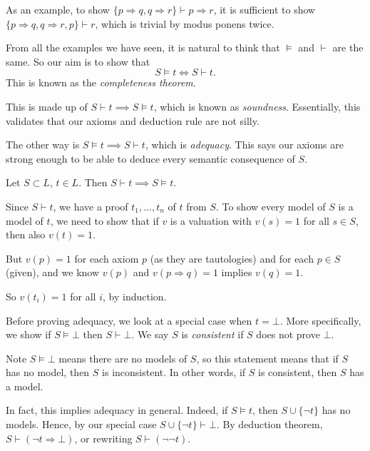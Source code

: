 \documentclass[12pt]{article}
\begin{document}
As an example, to show $\{p \Rightarrow q, q \Rightarrow r\} \vdash p \Rightarrow r$, it is sufficient to show $\{p \Rightarrow q, q \Rightarrow r, p\} \vdash r$, which is trivial by modus ponens twice.

From all the examples we have seen, it is natural to think that $\models$ and $\vdash$ are the same. So our aim is to show that
\[
	S \models t \iff S \vdash t
.\]
This is known as the \emph{completeness theorem}.

This is made up of $S \vdash t \implies S \models t$, which is known as \emph{soundness}. Essentially, this validates that our axioms and deduction rule are not silly.

The other way is $S \models t \implies S \vdash t$, which is \emph{adequacy}. This says our axioms are strong enough to be able to deduce every semantic consequence of $S$.

\begin{proposition}[Soundness]
	Let $S \subset L$, $t \in L$. Then $S \vdash t \implies S \models t$.
\end{proposition}

\begin{proofbox}
	Since $S \vdash t$, we have a proof $t_1, \ldots, t_n$ of $t$ from $S$. To show every model of $S$ is a model of $t$, we need to show that if $v$ is a valuation with $v(s) = 1$ for all $s \in S$, then also $v(t) = 1$.

	But $v(p) = 1$ for each axiom $p$ (as they are tautologies) and for each $p \in S$ (given), and we know $v(p)$ and $v(p \Rightarrow q) = 1$ implies $v(q) = 1$.

	So $v(t_i) = 1$ for all $i$, by induction.
\end{proofbox}

Before proving adequacy, we look at a special case when $t = \bot$. More specifically, we show if $S \models \bot$ then $S \vdash \bot$. We say $S$ is \emph{consistent} if $S$ does not prove $\bot$.

Note $S \models \bot$ means there are no models of $S$, so this statement means that if $S$ has no model, then $S$ is inconsistent. In other words, if $S$ is consistent, then $S$ has a model.

In fact, this implies adequacy in general. Indeed, if $S \models t$, then $S \cup \{\neg t\}$ has no models. Hence, by our special case $S \cup \{\neg t\} \vdash \bot$. By deduction theorem, $S \vdash (\neg t \Rightarrow \bot)$, or rewriting $S \vdash (\neg \neg t)$.
\end{document}
